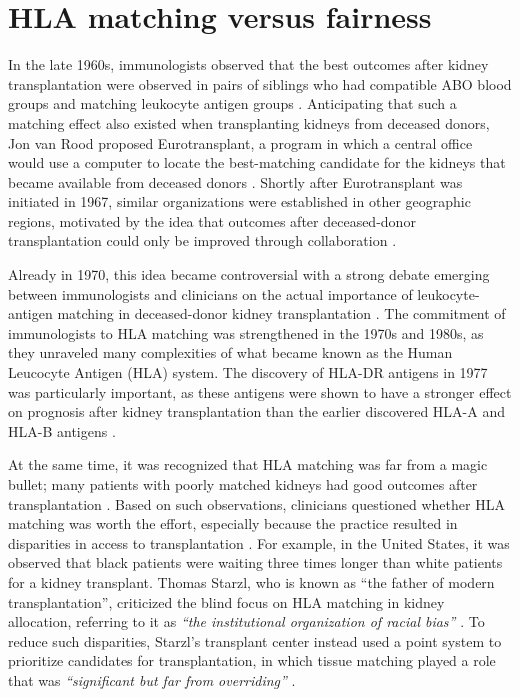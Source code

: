 \documentclass[11pt,twoside,]{book}
\begin{document}
\section{HLA matching versus fairness}\label{hla-matching-versus-fairness}

In the late 1960s, immunologists observed that the best outcomes after kidney
transplantation were observed in pairs of siblings who had compatible ABO blood groups
and matching leukocyte antigen groups \citep{vanDorp2001}. Anticipating that
such a matching effect also existed when transplanting kidneys from deceased donors,
Jon van Rood proposed Eurotransplant, a program in which a central office
would use a computer to locate the best-matching candidate for the kidneys that
became available from deceased donors \citep{vanRoodET1967}.
Shortly after Eurotransplant was initiated in 1967, similar organizations were
established in other geographic regions, motivated by the idea that outcomes after
deceased-donor transplantation could only be improved through collaboration \citep{bakJensenShareNotShare2008}.

Already in 1970, this idea became controversial with a strong debate emerging between
immunologists and clinicians on the actual importance of leukocyte-antigen
matching in deceased-donor kidney transplantation \citep{daussetHLAStory1995, vanRood2004}.
The commitment of immunologists to HLA matching was strengthened in the 1970s
and 1980s, as they unraveled many complexities of what became known
as the Human Leucocyte Antigen (HLA) system. The discovery of HLA-DR antigens in 1977
was particularly important, as these antigens were shown to have a stronger effect
on prognosis after kidney transplantation than the earlier discovered HLA-A
and HLA-B antigens \citep{Persijn1978, Persijn1981, bakJensenShareNotShare2008}.

At the same time, it was recognized that HLA matching was far from a magic bullet;
many patients with poorly matched kidneys had good outcomes after
transplantation \citep{terasaki1990history, vanRood2004}. Based on such observations,
clinicians questioned whether HLA matching was worth the effort, especially because
the practice resulted in disparities in access to transplantation \citep{Kjellstrand1988}.
For example, in the United States, it was observed that black patients were waiting
three times longer than white patients for a kidney transplant.
Thomas Starzl, who is known as ``the father of modern transplantation'', criticized the blind focus
on HLA matching in kidney allocation, referring to it as \emph{``the institutional
organization of racial bias''} \citep[159]{vanDorp2001}. To reduce such disparities,
Starzl's transplant center instead used a point system to prioritize candidates
for transplantation, in which tissue matching played a role that was
\emph{``significant but far from overriding''} \citep{starzlMultifactorialSystemEquitable1987}.
\end{document}
